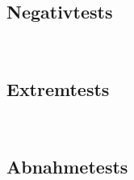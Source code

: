 
\subsection*{Negativtests}
\label{Abschnitt:Tests:Nicht:Negativ}

~\\




\subsection*{Extremtests}
\label{Abschnitt:Tests:Nicht:Extrem}

~\\




\subsection*{Abnahmetests}
\label{Abschnitt:Tests:Nicht:Abnahme}

~\\


